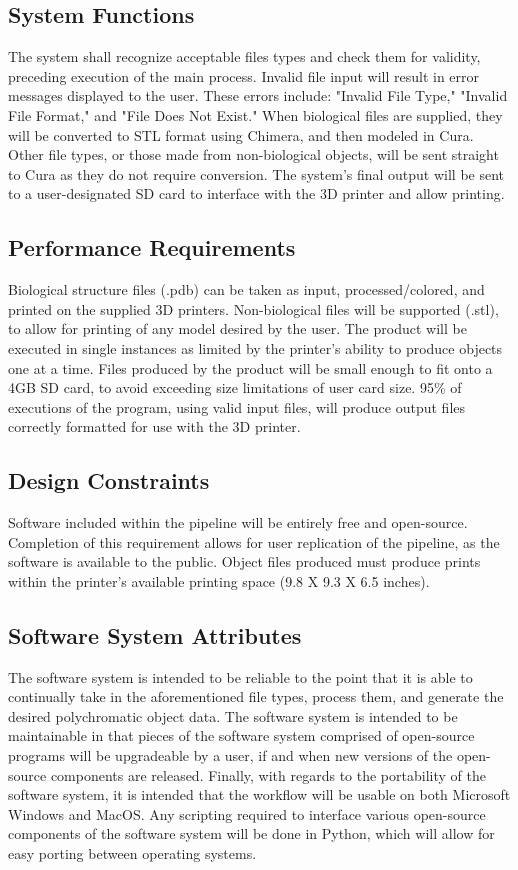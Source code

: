 \documentclass[letterpaper, onecolumn, draftclsnofoot, 10pt, compsoc]{IEEEtran}
\begin{document}
    \subsection{System Functions}
    The system shall recognize acceptable files types and check them for validity, preceding execution of the main process.
    Invalid file input will result in error messages displayed to the user.
    These errors include: "Invalid File Type," "Invalid File Format," and "File Does Not Exist."
    When biological files are supplied, they will be converted to STL format using Chimera, and then modeled in Cura. 
    Other file types, or those made from non-biological objects, will be sent straight to Cura as they do not require conversion.
    The system's final output will be sent to a user-designated SD card to interface with the 3D printer and allow printing.
    
    \subsection{Performance Requirements}
    Biological structure files (.pdb) can be taken as input, processed/colored, and printed on the supplied 3D printers.
	Non-biological files will be supported (.stl), to allow for printing of any model desired by the user.
    The product will be executed in single instances as limited by the printer's ability to produce objects one at a time.
    Files produced by the product will be small enough to fit onto a 4GB SD card, to avoid exceeding size limitations of user card size.
    95\% of executions of the program, using valid input files, will produce output files correctly formatted for use with the 3D printer.
    
    \subsection{Design Constraints}
    Software included within the pipeline will be entirely free and open-source. 
    Completion of this requirement allows for user replication of the pipeline, as the software is available to the public.
    Object files produced must produce prints within the printer's available printing space (9.8 X 9.3 X 6.5 inches).
    
    \subsection{Software System Attributes}
    The software system is intended to be reliable to the point that it is able to continually take in the aforementioned file types, process them, and generate the desired polychromatic object data. 
    The software system is intended to be maintainable in that pieces of the software system comprised of open-source programs will be upgradeable by a user, if and when new versions of the open-source components are released. 
    Finally, with regards to the portability of the software system, it is intended that the workflow will be usable on both Microsoft Windows and MacOS. 
    Any scripting required to interface various open-source components of the software system will be done in Python, which will allow for easy porting between operating systems.
\end{document}
